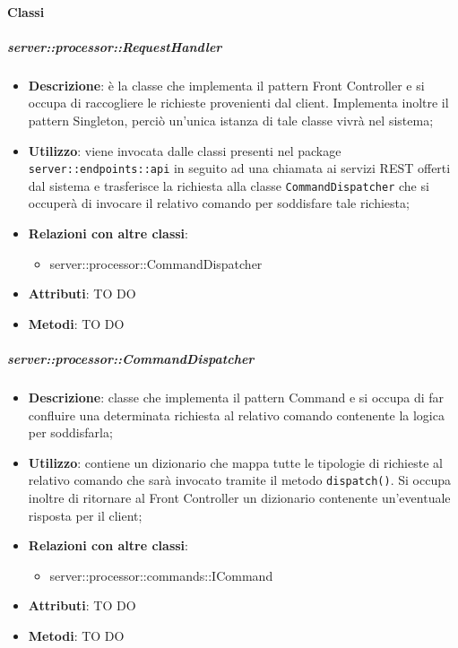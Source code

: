   \paragraph{Classi} %

    \subparagraph{server::processor::RequestHandler} %
    \label{subp:bdsm_app_server_processor_requesthandler}
    \begin{itemize}
      \item \textbf{Descrizione}: è la classe che implementa il pattern Front Controller e si occupa di raccogliere le richieste provenienti dal client. Implementa inoltre il pattern Singleton, perciò un'unica istanza di tale classe vivrà nel sistema;
      \item \textbf{Utilizzo}: viene invocata dalle classi presenti nel package \texttt{server::endpoints::api} in seguito ad una chiamata ai servizi REST offerti dal sistema e trasferisce la richiesta alla classe \texttt{CommandDispatcher} che si occuperà di invocare il relativo comando per soddisfare tale richiesta;
      \item \textbf{Relazioni con altre classi}:
        \begin{itemize}
          \item server::processor::CommandDispatcher
        \end{itemize}
		\item \textbf{Attributi}: TO DO
		\item \textbf{Metodi}: TO DO
      \end{itemize}

    \subparagraph{server::processor::CommandDispatcher} %
    \label{subp:bdsm_app_server_:processor_commanddispatcher}
    \begin{itemize}
      \item \textbf{Descrizione}: classe che implementa il pattern Command e si occupa di far confluire una determinata richiesta al relativo comando contenente la logica per soddisfarla;
      \item \textbf{Utilizzo}: contiene un dizionario che mappa tutte le tipologie di richieste al relativo comando che sarà invocato tramite il metodo \texttt{dispatch()}. Si occupa inoltre di ritornare al Front Controller un dizionario contenente un'eventuale risposta per il client;
      \item \textbf{Relazioni con altre classi}:
        \begin{itemize}
          \item server::processor::commands::ICommand
        \end{itemize}
		\item \textbf{Attributi}: TO DO
		\item \textbf{Metodi}: TO DO
      \end{itemize}


